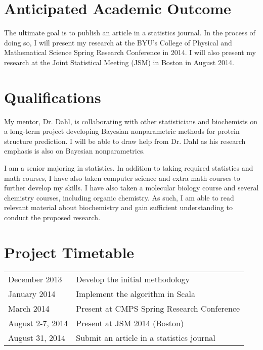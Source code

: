 \documentclass{article}
\begin{document}
\section*{\normalsize Anticipated Academic Outcome}
  The ultimate goal is to publish an article in a statistics journal. In the process of
  doing so, I will present my research at the BYU's College of Physical and Mathematical Science
  Spring Research Conference in 2014. I will also present my research 
  at the Joint Statistical Meeting (JSM) in Boston in August 2014.

\section*{\normalsize Qualifications}
  My mentor, Dr. Dahl, is collaborating with other statisticians 
  and biochemists on a long-term project developing Bayesian nonparametric 
  methods for protein structure prediction.
  I will be able to draw help from Dr. Dahl 
  as his research emphasis is also on Bayesian nonparametrics.

  I am a senior majoring in statistics. In addition to taking required 
  statistics and math courses, I have also taken computer 
  science and extra math courses to further develop my skills. 
  I have also taken a molecular biology course and several chemistry 
  courses, including organic chemistry. As such, I am able to read 
  relevant material about biochemistry and gain sufficient 
  understanding to conduct the proposed research.

\section*{\normalsize Project Timetable}
  \begin{tabular}{ll}
    December 2013&Develop the initial methodology\\
    January 2014&Implement the algorithm in Scala\\
    March 2014&Present at CMPS Spring Research Conference\\
    August 2-7, 2014&Present at JSM 2014 (Boston)\\
    August 31, 2014&Submit an article in a statistics journal
  \end{tabular}
\end{document}
